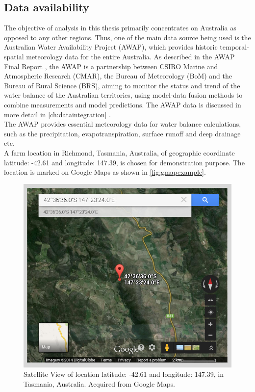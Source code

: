 \subsection{Data availability}
The objective of analysis in this thesis primarily concentrates on Australia as opposed to any other regions. Thus, one of the main data source being used is the Australian Water Availability Project (AWAP), which provides historic temporal-spatial meteorology data for the entire Australia. As described in the AWAP Final Report \citep{Raupach2009}, the AWAP is a partnership between CSIRO Marine and Atmospheric Research (CMAR), the Bureau of Meteorology (BoM) and the Bureau of Rural Science (BRS), aiming to monitor the status and trend of the water balance of the Australian territories, using model-data fusion methods to combine measurements and model predictions. The AWAP data is discussed in more detail in \autoref{ch:dataintegration} .\\
\newline
The AWAP provides essential meteorology data for water balance calculations, such as the precipitation, evapotranspiration, surface runoff and deep drainage etc.\\
\newline
A farm location in Richmond, Tasmania, Australia, of geographic coordinate latitude: -42.61 and longitude: 147.39, is chosen for demonstration purpose. The location is marked on Google Maps\citep{Google2014} as shown in \autoref{fig:gmapexample}.\\
\begin{figure}[hbt]
\begin{center}
\includegraphics[width=0.75\linewidth]{gfx/gmapexample}
\end{center}
\caption{Satellite View of location latitude: -42.61 and longitude: 147.39, in Tasmania, Australia. Acquired from Google Maps.}
\label{fig:gmapexample}
\end{figure}
